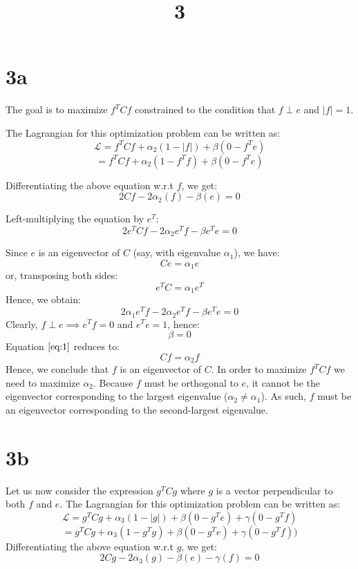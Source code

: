 \documentclass[a4paper]{article}
\title{3}
\date{}
\begin{document}
\maketitle


\section{3a}
The goal is to maximize $f^{T}Cf$ constrained to the condition that $f \perp e$ and $\lvert f \rvert = 1$.

\medskip

The Lagrangian for this optimization problem can be written as:
\[\mathscr{L} = f^{T}Cf + \alpha_{2}(1 - \lvert f \rvert) + \beta(0 - f^{T}e)\]
\[ =  f^{T}Cf + \alpha_{2}(1 - f^{T}f) + \beta(0 - f^{T}e) \]

Differentiating the above equation w.r.t $f$, we get:
\begin{equation}
 2Cf - 2\alpha_{2}(f)  -\beta(e) = 0 \label{eq:1}
\end{equation}

Left-multiplying the equation by $e^{T}$:
\[2e^{T}Cf - 2\alpha_{2}e^{T}f - \beta e^{T}e = 0\]

Since $e$ is an eigenvector of $C$ (say, with eigenvalue $\alpha_{1}$), we have:
\[ Ce = \alpha_{1}e\]
or, transposing both sides:
\[e^{T}C = \alpha_{1}e^{T}\]
Hence, we obtain:
\[2\alpha_{1}e^{T}f - 2\alpha_{2}e^{T}f - \beta e^{T}e = 0\]
Clearly, $f \perp e \implies  e^{T}f = 0$ and $e^{T}e = 1$, hence:
\[\beta = 0\]
Equation $\eqref{eq:1}$ reduces to:
\[Cf = \alpha_{2}f\]
Hence, we conclude that $f$ is an eigenvector of $C$. In order to maximize $f^{T}Cf$ we need to maximize $\alpha_2$. Because $f$ must be orthogonal to $e$, it cannot be the eigenvector corresponding to the largest eigenvalue ($\alpha_{2} \neq \alpha_{1}$). As such, $f$ must be an eigenvector corresponding to the second-largest eigenvalue.

\section{3b}
Let us now consider the expression $g^{T}Cg$ where $g$ is a vector perpendicular to both $f$ and $e$. The Lagrangian for this optimization problem can be written as:
\[\mathscr{L} = g^{T}Cg + \alpha_{3}(1 - \lvert g \rvert) + \beta(0 - g^{T}e) + \gamma(0 - g^{T}f )\]
\[ = g^{T}Cg + \alpha_{3}(1 - g^{T}g) + \beta(0 - g^{T}e) + \gamma(0 - g^{T}f )) \]
Differentiating the above equation w.r.t $g$, we get:
\begin{equation}
 2Cg - 2\alpha_{3}(g)  -\beta(e) - \gamma(f) = 0 \label{eq:2}
\end{equation}
\end{document}
